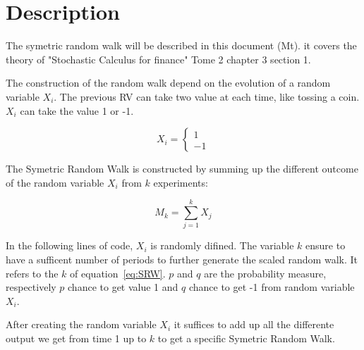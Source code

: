 \documentclass{article}\usepackage[]{graphicx}\usepackage[]{color}
\makeatletter
\newenvironment{kframe}{%
 \def\at@end@of@kframe{}%
 \ifinner\ifhmode%
  \def\at@end@of@kframe{\end{minipage}}%
  \begin{minipage}{\columnwidth}%
 \fi\fi%
 \def\FrameCommand##1{\hskip\@totalleftmargin \hskip-\fboxsep
 \colorbox{shadecolor}{##1}\hskip-\fboxsep
     \hskip-\linewidth \hskip-\@totalleftmargin \hskip\columnwidth}%
 \MakeFramed {\advance\hsize-\width
   \@totalleftmargin\z@ \linewidth\hsize
   \@setminipage}}%
 {\par\unskip\endMakeFramed%
 \at@end@of@kframe}
\newenvironment{knitrout}{}{} %
\makeatother
\begin{document}

\begin{knitrout}
\color{fgcolor}\begin{kframe}


{\ttfamily\noindent\itshape\color{messagecolor}{\#\# Registering fonts with R}}

{\ttfamily\noindent\color{warningcolor}{\#\# Warning: package 'ggplot2' was built under R version 3.3.3}}

{\ttfamily\noindent\color{warningcolor}{\#\# Warning: package 'xtable' was built under R version 3.3.3}}\end{kframe}
\end{knitrout}


\section{Description}
The symetric random walk will be described in this document (Mt). it covers the theory of "Stochastic Calculus for finance" Tome 2 chapter 3 section 1.

The construction of the random walk depend on the evolution of a random variable $X_i$. The previous RV can take two value at each time, like tossing a coin. $X_i$ can take the value 1 or -1.

\begin{equation}
 \label{eq:Xi}
X_i = 
\left \{{
  \begin{array}{c} 1 \\ -1 \end{array}
  }\right .
\end{equation}
 
The Symetric Random Walk is constructed by summing up the different outcome of the random variable $X_i$ from $k$ experiments:

\begin{equation}
\label{eq:SRW}
M_k = 
\sum_{j=1}^k X_j
\end{equation}

In the following lines of code, $X_i$ is randomly difined. The variable $k$ ensure to have a sufficent number of periods to further generate the scaled random walk.
It refers to the $k$ of equation~\ref{eq:SRW}.
$p$ and $q$ are the probability measure, respectively $p$ chance to get value 1 and $q$ chance to get -1 from random variable $X_i$.

 


After creating the random variable $X_i$ it suffices to add up all the differente output we get from time 1 up to $k$ to get a specific Symetric Random Walk.
\end{document}
